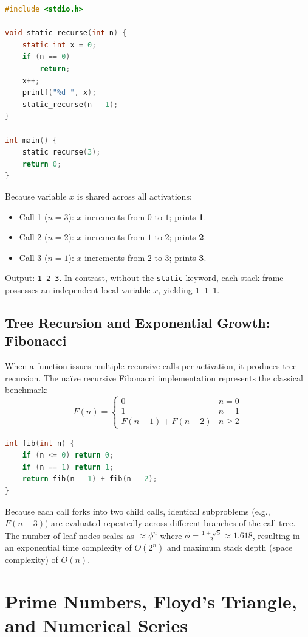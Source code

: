 \begin{lstlisting}[language=C]
#include <stdio.h>

void static_recurse(int n) {
    static int x = 0;
    if (n == 0)
        return;
    x++;
    printf("%d ", x);
    static_recurse(n - 1);
}

int main() {
    static_recurse(3);
    return 0;
}
\end{lstlisting}
Because variable $x$ is shared across all activations:
\begin{itemize}[leftmargin=*]
    \item Call 1 ($n=3$): $x$ increments from $0$ to $1$; prints \textbf{1}.
    \item Call 2 ($n=2$): $x$ increments from $1$ to $2$; prints \textbf{2}.
    \item Call 3 ($n=1$): $x$ increments from $2$ to $3$; prints \textbf{3}.
\end{itemize}
Output: \texttt{1 2 3}. In contrast, without the \texttt{static} keyword, each stack frame possesses an independent local variable $x$, yielding \texttt{1 1 1}.

\subsection{Tree Recursion and Exponential Growth: Fibonacci}
When a function issues multiple recursive calls per activation, it produces tree recursion. The naïve recursive Fibonacci implementation represents the classical benchmark:
\[
F(n) = \begin{cases} 0 & n = 0 \\ 1 & n = 1 \\ F(n-1) + F(n-2) & n \ge 2 \end{cases}
\]

\begin{lstlisting}[language=C]
int fib(int n) {
    if (n <= 0) return 0;
    if (n == 1) return 1;
    return fib(n - 1) + fib(n - 2);
}
\end{lstlisting}
Because each call forks into two child calls, identical subproblems (e.g., $F(n-3)$) are evaluated repeatedly across different branches of the call tree. The number of leaf nodes scales as $\approx \phi^n$ where $\phi = \frac{1+\sqrt{5}}{2} \approx 1.618$, resulting in an exponential time complexity of $O(2^n)$ and maximum stack depth (space complexity) of $O(n)$.

\section{Prime Numbers, Floyd's Triangle, and Numerical Series}
\label{sec:prime_numbers_series}

